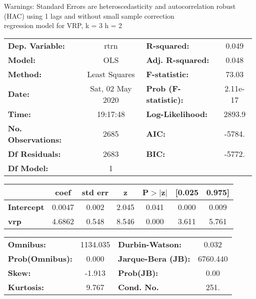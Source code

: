 Warnings: \newline
 [1] Standard Errors are heteroscedasticity and autocorrelation robust (HAC) using 1 lags and without small sample correction\\ 

regression model for VRP, k = 3 h = 2\begin{center}
\begin{tabular}{lclc}
\toprule
\textbf{Dep. Variable:}    &       rtrn       & \textbf{  R-squared:         } &     0.049   \\
\textbf{Model:}            &       OLS        & \textbf{  Adj. R-squared:    } &     0.048   \\
\textbf{Method:}           &  Least Squares   & \textbf{  F-statistic:       } &     73.03   \\
\textbf{Date:}             & Sat, 02 May 2020 & \textbf{  Prob (F-statistic):} &  2.11e-17   \\
\textbf{Time:}             &     19:17:48     & \textbf{  Log-Likelihood:    } &    2893.9   \\
\textbf{No. Observations:} &        2685      & \textbf{  AIC:               } &    -5784.   \\
\textbf{Df Residuals:}     &        2683      & \textbf{  BIC:               } &    -5772.   \\
\textbf{Df Model:}         &           1      & \textbf{                     } &             \\
\bottomrule
\end{tabular}
\begin{tabular}{lcccccc}
                   & \textbf{coef} & \textbf{std err} & \textbf{z} & \textbf{P$> |$z$|$} & \textbf{[0.025} & \textbf{0.975]}  \\
\midrule
\textbf{Intercept} &       0.0047  &        0.002     &     2.045  &         0.041        &        0.000    &        0.009     \\
\textbf{vrp}       &       4.6862  &        0.548     &     8.546  &         0.000        &        3.611    &        5.761     \\
\bottomrule
\end{tabular}
\begin{tabular}{lclc}
\textbf{Omnibus:}       & 1134.035 & \textbf{  Durbin-Watson:     } &    0.032  \\
\textbf{Prob(Omnibus):} &   0.000  & \textbf{  Jarque-Bera (JB):  } & 6760.440  \\
\textbf{Skew:}          &  -1.913  & \textbf{  Prob(JB):          } &     0.00  \\
\textbf{Kurtosis:}      &   9.767  & \textbf{  Cond. No.          } &     251.  \\
\bottomrule
\end{tabular}
\end{center}

